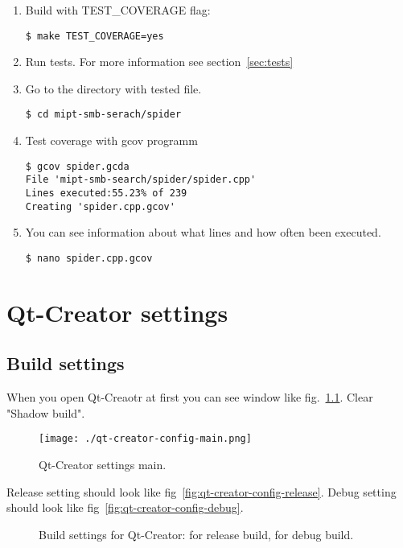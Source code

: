 \begin{enumerate}
  \item Build with TEST\_COVERAGE flag:
\begin{lstlisting}
$ make TEST_COVERAGE=yes
\end{lstlisting}
  \item Run tests. For more information see section~\ref{sec:tests}
  \item Go to the directory with tested file.
\begin{lstlisting}
$ cd mipt-smb-serach/spider
\end{lstlisting}
  \item Test coverage with gcov programm
\begin{lstlisting}
$ gcov spider.gcda
File 'mipt-smb-search/spider/spider.cpp'
Lines executed:55.23% of 239
Creating 'spider.cpp.gcov'
\end{lstlisting}
  \item You can see information about what lines and how often been executed.
\begin{lstlisting}
$ nano spider.cpp.gcov
\end{lstlisting}
\end{enumerate}

\chapter{Qt-Creator settings}

\section{Build settings}\label{sec:qt-build}

When you open Qt-Creaotr at first you can see window like fig.~\ref{fig:qt-creator-config-main}. Clear "Shadow build".

\begin{figure}[ht]
  \centering
  \texttt{[image: ./qt-creator-config-main.png]}
  \caption{Qt-Creator settings main.}
  \label{fig:qt-creator-config-main}
\end{figure}

Release setting should look like fig~\ref{fig:qt-creator-config-release}. Debug setting should look like fig~\ref{fig:qt-creator-config-debug}.

\begin{figure}[ht]
  \centering
  \caption{Build settings for Qt-Creator:  for release build,  for debug build.}
\end{figure}

